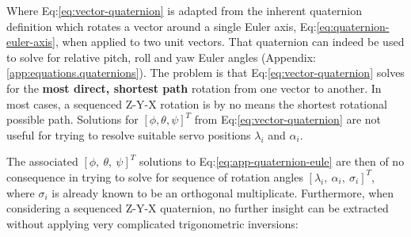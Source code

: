 Where Eq:\ref{eq:vector-quaternion} is adapted from the inherent quaternion definition which rotates a vector around a single Euler axis, Eq:\ref{eq:quaternion-euler-axis}, when applied to two unit vectors. That quaternion can indeed be used to solve for relative pitch, roll and yaw Euler angles (Appendix:\ref{app:equations.quaternions}). The problem is that Eq:\ref{eq:vector-quaternion} solves for the \textbf{most direct, shortest path} rotation from one vector to another. In most cases, a sequenced Z-Y-X rotation is by no means the shortest rotational possible path. Solutions for $[\phi,\theta,\psi]^T$ from Eq:\ref{eq:vector-quaternion} are not useful for trying to resolve suitable servo positions $\lambda_i$ and $\alpha_i$.
\par
The associated $[\phi,~\theta,~\psi]^T$ solutions to Eq:\ref{eq:app-quaternion-eule} are then of no consequence in trying to solve for sequence of rotation angles $[\lambda_i,~\alpha_i,~\sigma_i]^T$, where $\sigma_i$ is already known to be an orthogonal multiplicate. Furthermore, when considering a sequenced Z-Y-X quaternion, no further insight can be extracted without applying very complicated trigonometric inversions:
